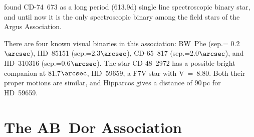 \documentclass[11pt,twoside]{book}
\begin{document}
\citet{guenther07} found CD-74~673 as a long period (613.9d)
single line spectroscopic binary star, and until now it is the only  spectroscopic
binary among the field stars of the Argus Association.

There are four known visual binaries in this association: BW~Phe
(sep.= 0.2$\arcsec$), HD~85151 (sep.=2.3$\arcsec$), CD-65~817
(sep.=2.0$\arcsec$), and HD~310316 (sep.=0.6$\arcsec$).  The star CD-48~2972
has a possible bright companion at 81.7$\arcsec$, HD~59659, a F7V star
with V~=~8.80.  Both their proper motions are similar, and Hipparcos
gives a distance of 90\,pc for HD~59659.


\section{The AB~Dor Association}
\end{document}

